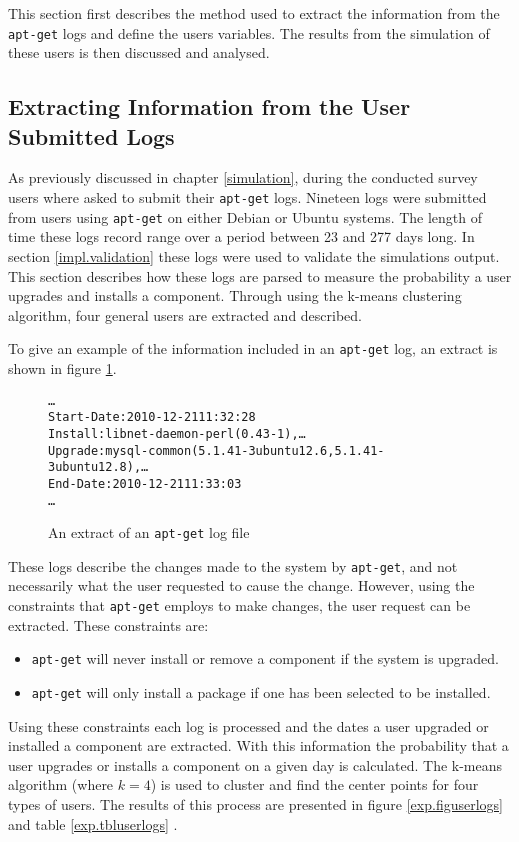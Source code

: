 This section first describes the method used to extract the information from the \texttt{apt-get} logs and define the users variables.
The results from the simulation of these users is then discussed and analysed.

\subsection{Extracting Information from the User Submitted Logs}
As previously discussed in chapter \ref{simulation}, during the conducted survey users where asked to submit their \texttt{apt-get} logs.
Nineteen logs were submitted from users using \texttt{apt-get} on either Debian or Ubuntu systems.
The length of time these logs record range over a period between 23 and 277 days long. 
In section \ref{impl.validation} these logs were used to validate the simulations output.
This section describes how these logs are parsed to measure the probability a user upgrades and installs a component.
Through using the k-means clustering algorithm, four general users are extracted and described.

To give an example of the information included in an \texttt{apt-get} log, an extract is shown in figure \ref{aptlog}.
\begin{figure}[htp]
\begin{center}
\begin{alltt}
\ldots
Start-Date: 2010-12-21 11:32:28
Install: libnet-daemon-perl (0.43-1), \ldots
Upgrade: mysql-common (5.1.41-3ubuntu12.6, 5.1.41-3ubuntu12.8), \ldots
End-Date: 2010-12-21 11:33:03
\ldots
\end{alltt}
\caption{An extract of an \texttt{apt-get} log file}
\label{aptlog}
\end{center}
\end{figure}

These logs describe the changes made to the system by \texttt{apt-get}, and not necessarily what the user requested to cause the change.
However, using the constraints that \texttt{apt-get} employs to make changes, the user request can be extracted.
These constraints are:
\begin{itemize}
  \item \texttt{apt-get} will never install or remove a component if the system is upgraded.
  \item \texttt{apt-get} will only install a package if one has been selected to be installed.
\end{itemize}
Using these constraints each log is processed and the dates a user upgraded or installed a component are extracted.
With this information the probability that a user upgrades or installs a component on a given day is calculated.
The k-means algorithm (where $k=4$) is used to cluster and find the center points for four types of users.
The results of this process are presented in figure \ref{exp.figuserlogs} and table \ref{exp.tbluserlogs} .

